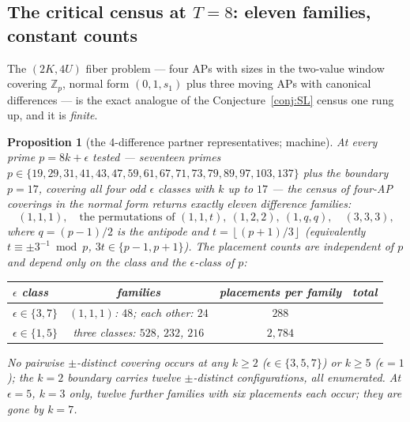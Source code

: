 \documentclass[11pt,a4paper]{article}
\numberwithin{equation}{section}
\theoremstyle{plain}
\theoremstyle{plain}
\newtheorem{proposition}[theorem]{Proposition}
\theoremstyle{definition}
\theoremstyle{remark}
\newcommand{\Z}{\mathbb{Z}}
\newcommand{\floor}[1]{\left\lfloor #1 \right\rfloor}
\begin{document}
\subsection{The critical census at \texorpdfstring{$T=8$}{T=8}: eleven families, constant counts}

The $(2K,4U)$ fiber problem --- four APs with sizes in the two-value
window covering $\Z_p$, normal form $(0,1,s_1)$ plus three moving APs
with canonical differences --- is the exact analogue of the
Conjecture~\ref{conj:SL} census one rung up, and it is \emph{finite}.

\begin{proposition}[the 4-difference partner representatives; machine]
\label{prop:T8census}
At every prime $p=8k+\epsilon$ tested --- seventeen primes
$p\in\{19,29,31,41,43,47,59,61,67,71,73,79,89,97,103,137\}$ plus the
boundary $p=17$, covering all four odd $\epsilon$ classes with $k$ up to
$17$ --- the census of four-AP coverings in the normal form returns
\emph{exactly eleven difference families}:
\[
(1,1,1),\quad\text{the permutations of }(1,1,t),\ (1,2,2),\ (1,q,q),
\quad(3,3,3),
\]
where $q=(p-1)/2$ is the antipode and $t=\floor{(p+1)/3}$ (equivalently
$t\equiv\pm3^{-1}\bmod p$, $3t\in\{p-1,p+1\}$). The placement counts are
independent of $p$ and depend only on the class and the $\epsilon$-class
of $p$:
\begin{center}
\small
\begin{tabular}{@{}lccc@{}}
\toprule
$\epsilon$ class & families & placements per family & total \\
\midrule
$\epsilon\in\{3,7\}$ & $(1,1,1)$: $48$; each other: $24$ & $288$ \\
$\epsilon\in\{1,5\}$ & three classes: $528$, $232$, $216$ & $2{,}784$ \\
\bottomrule
\end{tabular}
\end{center}
\noindent No pairwise $\pm$-distinct covering occurs at any $k\ge2$
($\epsilon\in\{3,5,7\}$) or $k\ge5$ ($\epsilon=1$); the $k=2$ boundary
carries twelve $\pm$-distinct configurations, all enumerated. At
$\epsilon=5$, $k=3$ only, twelve further families with six placements
each occur; they are gone by $k=7$.
\end{proposition}
\end{document}

